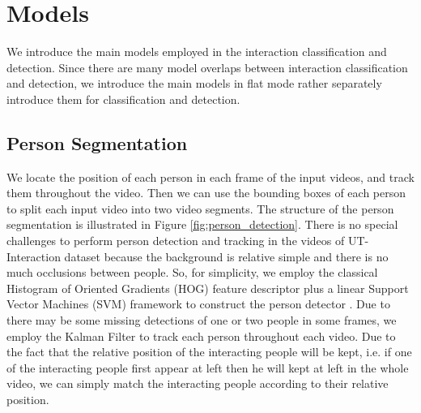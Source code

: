 \section{Models}
We introduce the main models employed in the interaction classification and detection. Since there are many model overlaps between interaction classification and detection, we introduce the main models in flat mode rather separately introduce them for classification and detection.   
\subsection{Person Segmentation}
\label{person_segmentation}
We locate the position of each person in each frame of the input videos, and track them throughout the video. Then we can use the bounding boxes of each person to split each input video into two video segments. The structure of the person segmentation is illustrated in Figure \ref{fig:person_detection}. There is no special challenges to perform person detection and tracking in the videos of UT-Interaction dataset because the background is relative simple and there is no much occlusions between people. So, for simplicity, we employ the classical Histogram of Oriented Gradients (HOG) feature descriptor plus a linear Support Vector Machines (SVM) framework to construct the person detector \cite{inria_person}.  Due to there may be some missing detections of one or two people in some frames, we employ the Kalman Filter to track each person throughout each video. Due to the fact that the relative position of the interacting people will be kept, i.e. if one of the interacting people first appear at left then he will kept at left in the whole video, we can simply match the interacting people according to their relative position. 
    
